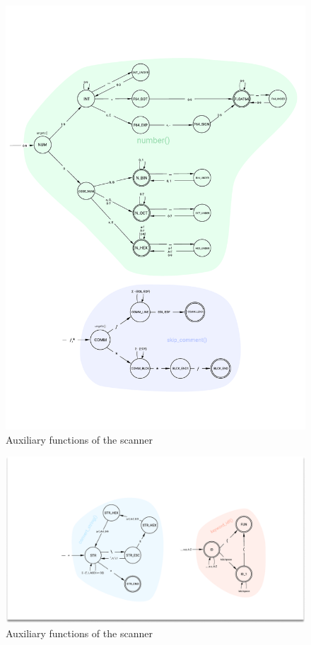 \documentclass[12pt]{article}
\begin{document}
\begin{figure}[H]
\label{figure:aux_fsm}
		\vspace{-1cm}	
		\centering
		\hspace{-1cm}
		\includegraphics[trim={1cm 1cm -1cm 3.5cm},clip, width=1.15\linewidth]{img/number_fsm.pdf}
		\caption{Auxiliary functions of the scanner}
\end{figure}
\begin{figure}[H]

		\hspace{-1.2cm}
		\includegraphics[trim=1cm 1cm 1cm 1cm, clip, width=1.2\linewidth]{img/aux_func.pdf}
		
		\caption{Auxiliary functions of the scanner}
\end{figure}
\end{document}
